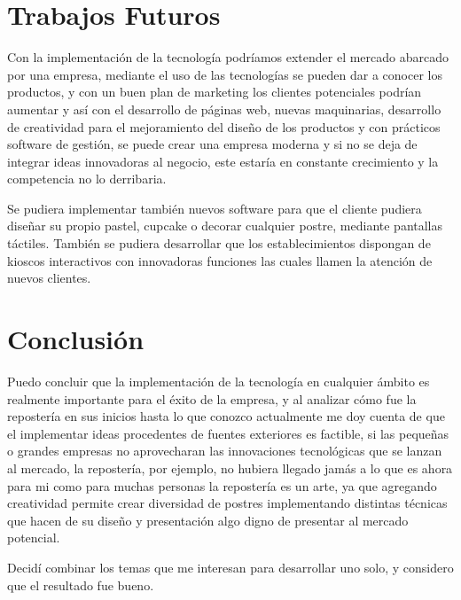 \documentclass{bmcart}
\begin{document}
\section{Trabajos Futuros}


Con la implementación de la tecnología podríamos extender el mercado abarcado por una empresa, mediante el uso de las tecnologías se pueden dar a conocer los productos, y con un buen plan de marketing los clientes potenciales podrían aumentar y así con el desarrollo de páginas web, nuevas maquinarias, desarrollo de creatividad para el mejoramiento del diseño de los productos y con prácticos software de gestión, se puede crear una empresa moderna y si no se deja de integrar ideas innovadoras al negocio, este estaría en constante crecimiento y la competencia no lo derribaria. 

Se pudiera implementar también nuevos software para que el cliente pudiera diseñar su propio pastel, cupcake o decorar cualquier postre, mediante pantallas táctiles.
También se pudiera desarrollar que los establecimientos dispongan de kioscos interactivos con innovadoras funciones las cuales llamen la atención de nuevos clientes.

\section{Conclusión}
Puedo concluir que la implementación de la tecnología en cualquier ámbito es realmente importante para el éxito de la empresa, y al analizar cómo fue la repostería en sus inicios hasta lo que conozco actualmente me doy cuenta de que el implementar ideas procedentes de fuentes exteriores es factible, si las pequeñas o grandes empresas no aprovecharan las innovaciones tecnológicas que se lanzan al mercado, la repostería, por ejemplo, no hubiera llegado jamás a lo que es ahora para mi como para muchas personas la repostería es un arte, ya que agregando creatividad permite crear diversidad de postres implementando distintas técnicas que hacen de su diseño y presentación algo digno de presentar al mercado potencial.

Decidí combinar los temas que me interesan para desarrollar uno solo, y considero que el resultado fue bueno.


\end{document}
